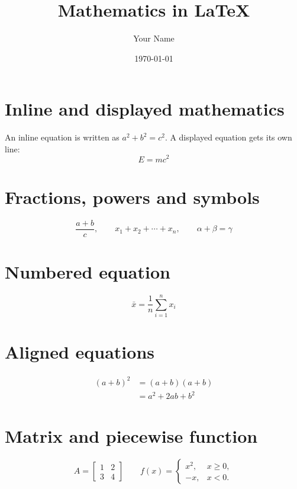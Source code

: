 \documentclass[11pt,a4paper]{article}
\title{Mathematics in LaTeX}
\author{Your Name}
\date{\today}
\begin{document}
\maketitle

\section{Inline and displayed mathematics}
An inline equation is written as \(a^2+b^2=c^2\). A displayed equation gets its own line:
\[
E = mc^2
\]

\section{Fractions, powers and symbols}
\[
\frac{a+b}{c}, \qquad x_1+x_2+\cdots+x_n, \qquad \alpha+\beta=\gamma
\]

\section{Numbered equation}
\begin{equation}
\bar{x}=\frac{1}{n}\sum_{i=1}^{n}x_i
\end{equation}

\section{Aligned equations}
\begin{align}
(a+b)^2 &= (a+b)(a+b)\\
        &= a^2+2ab+b^2
\end{align}

\section{Matrix and piecewise function}
\[
A=\begin{bmatrix}1&2\\3&4\end{bmatrix}
\qquad
f(x)=\begin{cases}
x^2,&x\geq 0,\\
-x,&x<0.
\end{cases}
\]
\end{document}

